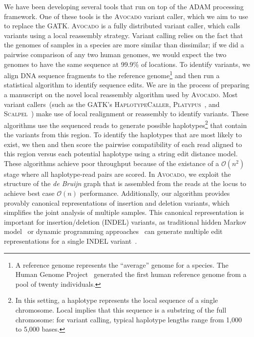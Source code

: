 \documentclass[11pt]{article} %
\begin{document}
We have been developing several tools that run on top of the \textsc{ADAM} processing framework.
One of these tools is the \textsc{Avocado} variant caller, which we aim to use to replace the
\textsc{GATK}. \textsc{Avocado} is a fully distributed variant caller, which calls variants using
a local reassembly strategy. Variant calling relies on the fact that the genomes of samples in
a species are more similar than dissimilar; if we did a pairwise comparison of any two human
genomes, we would expect the two genomes to have the same sequence at 99.9\% of locations. To
identify variants, we align DNA sequence fragments to the reference genome\footnote{A reference
genome represents the ``average'' genome for a species. The Human Genome Project~\cite{lander01}
generated the first human reference genome from a pool of twenty individuals.} and then run a
statistical algorithm to identify sequence edits. We are in the process of preparing a manuscript
on the novel local reassembly algorithm used by \textsc{Avocado}. Most variant callers~(such as
the \textsc{GATK}'s \textsc{HaplotypeCaller}, \textsc{Platypus}~\cite{rimmer14}, and
\textsc{Scalpel}~\cite{narzisi14}) make use of local realignment or reassembly to identify
variants. These algorithms use the sequenced reads to generate possible haplotypes\footnote{In
this setting, a haplotype represents the local sequence of a single chromosome. Local implies that
this sequence is a substring of the full chromosome: for variant calling, typical haplotype lengths
range from 1,000 to 5,000 bases.} that contain the variants from this region. To identify the
haplotypes that are most likely to exist, we then and then score the pairwise compatibility of
each read aligned to this region versus each potential haplotype using a string edit distance model.
These algorithms achieve poor throughput because of the existance of a $\mathcal{O}(n^2)$ stage
where all haplotype-read pairs are scored. In \textsc{Avocado}, we exploit the structure of the
\emph{de Bruijn} graph that is assembled from the reads at the locus to achieve best case
$\mathcal{O}(n)$ performance. Additionally, our algorithm provides provably canonical
representations of insertion and deletion variants, which simplifies the joint analysis of multiple
samples. This canonical representation is important for insertion/deletion (INDEL) variants, as
traditional hidden Markov model~\cite{durbin98} or dynamic programming approaches~\cite{smith81}
can generate multiple edit representations for a single INDEL variant~\cite{paten14}.
\end{document}
